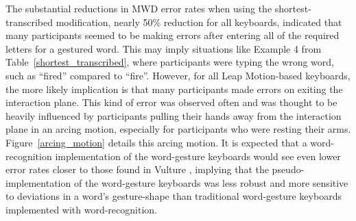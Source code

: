 The substantial reductions in MWD error rates when using the shortest-transcribed modification, nearly 50\% reduction for all keyboards, indicated that many participants seemed to be making errors after entering all of the required letters for a gestured word. This may imply situations like Example 4 from Table~\ref{shortest_transcribed}, where participants were typing the wrong word, such as ``fired'' compared to ``fire''. However, for all Leap Motion-based keyboards, the more likely implication is that many participants made errors on exiting the interaction plane. This kind of error was observed often and was thought to be heavily influenced by participants pulling their hands away from the interaction plane in an arcing motion, especially for participants who were resting their arms. Figure~\ref{arcing_motion} details this arcing motion. It is expected that a word-recognition implementation of the word-gesture keyboards would see even lower error rates closer to those found in Vulture \cite{ref_vulture}, implying that the pseudo-implementation of the word-gesture keyboards was less robust and more sensitive to deviations in a word's gesture-shape than traditional word-gesture keyboards implemented with word-recognition.

